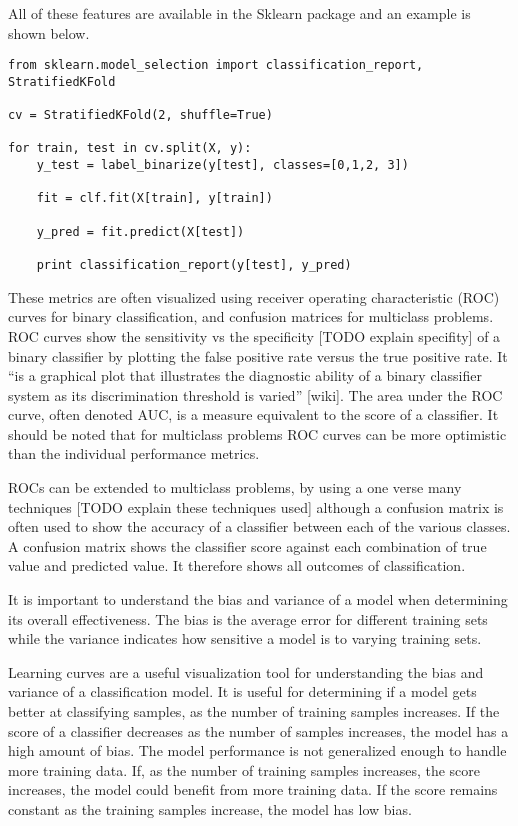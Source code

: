 All of these features are available in the Sklearn package and an example is shown below.
%
\begin{lstlisting}
from sklearn.model_selection import classification_report, StratifiedKFold

cv = StratifiedKFold(2, shuffle=True)

for train, test in cv.split(X, y):
    y_test = label_binarize(y[test], classes=[0,1,2, 3])

    fit = clf.fit(X[train], y[train])

    y_pred = fit.predict(X[test])

    print classification_report(y[test], y_pred)
\end{lstlisting}
%
These metrics are often visualized using receiver operating characteristic (ROC) curves for binary classification, and confusion matrices for multiclass problems.  ROC curves show the sensitivity vs the specificity [TODO explain specifity] of a binary classifier by plotting the false positive rate versus the true positive rate.  It “is a graphical plot that illustrates the diagnostic ability of a binary classifier system as its discrimination threshold is varied” [wiki]. The area under the ROC curve, often denoted AUC, is a measure equivalent to the score of a classifier. It should be noted that for multiclass problems ROC curves can be more optimistic than the individual performance metrics.

ROCs can be extended to multiclass problems, by using a one verse many techniques [TODO explain these techniques used] although a confusion matrix is often used to show the accuracy of a classifier between each of the various classes.  A confusion matrix shows the classifier score against each combination of true value and predicted value.  It therefore shows all outcomes of classification.

It is important to understand the bias and variance of a model when determining its overall effectiveness.  The bias is the average error for different training sets while the variance indicates how sensitive a model is to varying training sets.

Learning curves are a useful visualization tool for understanding the bias and variance of a classification model.  It is useful for determining if a model gets better at classifying samples, as the number of training samples increases.  If the score of a classifier decreases as the number of samples increases, the model has a high amount of bias.  The model performance is not generalized enough to handle more training data.  If, as the number of training samples increases, the score increases, the model could benefit from more training data.  If the score remains constant as the training samples increase, the model has low bias.

